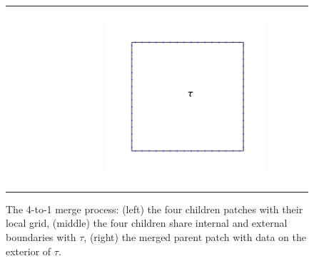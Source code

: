 \begin{figure}
\begin{tabular}{ccc}
\begin{subfigure}[t]{0.3\textwidth}
            \label{subfig:4_patches}
        \end{subfigure}
        &
        \begin{subfigure}[t]{0.3\textwidth}
            \centering
            \includegraphics[width=\textwidth, clip=true, trim={100 150 100 150}]{figures/merged_patch.pdf}
            \label{subfig:parent_patch}
        \end{subfigure}
    \end{tabular}
    \caption{The 4-to-1 merge process: (left) the four children patches with their local grid, (middle) the four children share internal and external boundaries with $\tau$, (right) the merged parent patch with data on the exterior of $\tau$.}
    \label{fig:4_to_1_patches}
\end{figure}


